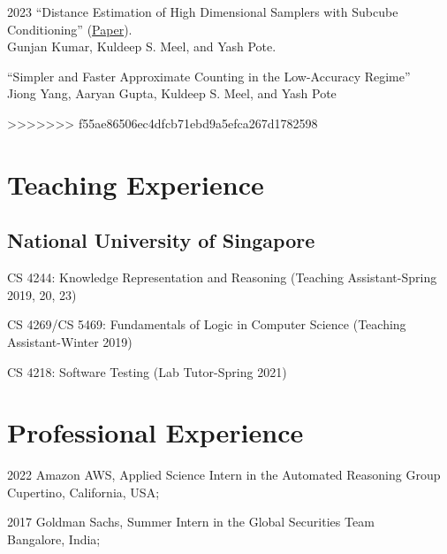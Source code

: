 \documentclass[12pt,letterpaper]{report}
\newcommand{\listitemspace}{0.15em}
\renewenvironment{itemize}
{\begin{list}{}{\setlength{\leftmargin}{0em}
			\setlength{\parskip}{0em}
			\setlength{\itemsep}{\listitemspace}
			\setlength{\parsep}{\listitemspace}}}
	{\end{list}}
\begin{document}
	\begin{tablist}
		\item[2023] \tab  	\enquote{Distance Estimation of High Dimensional Samplers with Subcube Conditioning} (\href{https://arxiv.org/abs/2308.04264}{Paper}).\\
		Gunjan Kumar,  Kuldeep S. Meel, and Yash Pote.
		
	
		
		\item[\the\year] \tab  	\enquote{Simpler and Faster Approximate Counting in the Low-Accuracy Regime}\\
		Jiong Yang, Aaryan Gupta, Kuldeep S. Meel,  and Yash Pote
	\end{tablist}
>>>>>>> f55ae86506ec4dfcb71ebd9a5efca267d1782598
	
	
	\section*{Teaching Experience}
	
	\subsection*{National University of Singapore}
	
	\begin{itemize}
		
		\item   CS 4244: Knowledge Representation and Reasoning (Teaching Assistant-Spring 2019, 20, 23)
		\item   CS 4269/CS 5469: Fundamentals of Logic in Computer Science (Teaching Assistant-Winter 2019)
		\item   CS 4218: Software Testing (Lab Tutor-Spring 2021)
		
	\end{itemize}
	
	\section*{Professional Experience}
	\begin{tablist}
		\item[2022] \tab Amazon AWS, Applied Science Intern in the Automated Reasoning Group\\
		Cupertino, California, USA;
	\end{tablist}
	\begin{tablist}
		\item[2017] \tab Goldman Sachs, Summer Intern in the Global Securities Team\\
		Bangalore, India;
	\end{tablist}
	
\end{document}
